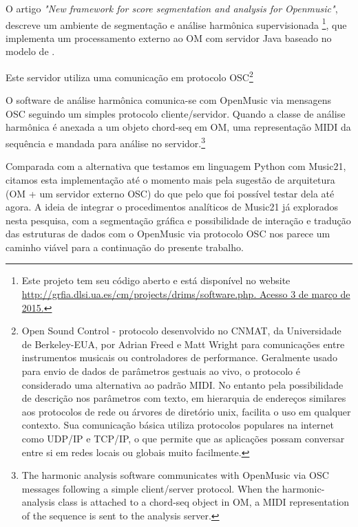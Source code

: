 \documentclass[
	12pt,				%
	openright,			%
	twoside,			%
	a4paper,			%
	english,			%
	french,				%
	spanish,			%
	brazil				%
	]{abntex2}
\begin{document}
O artigo \textit{"New framework for score segmentation and analysis for Openmusic"}\cite{bresson2012new}, descreve um ambiente de segmentação e análise harmônica supervisionada \footnote{Este projeto tem seu código aberto e está disponível no website \url{http://grfia.dlsi.ua.es/cm/projects/drims/software.php. Acesso 3 de março de 2015.}}, que implementa um processamento externo ao OM com servidor Java baseado no modelo de .

Este servidor utiliza uma comunicação em protocolo OSC\footnote{Open Sound Control - protocolo desenvolvido no CNMAT, da Universidade de Berkeley-EUA, por Adrian Freed e Matt Wright para comunicações entre instrumentos musicais ou controladores de performance. Geralmente usado para envio de dados de parâmetros gestuais ao vivo, o protocolo é considerado uma alternativa ao padrão MIDI. No entanto pela possibilidade de descrição nos parâmetros com texto, em hierarquia de endereços similares aos protocolos de rede ou árvores de diretório unix, facilita o uso em qualquer contexto. Sua comunicação básica utiliza protocolos populares na internet como UDP/IP e TCP/IP, o que permite que as aplicações possam conversar entre si em redes locais ou globais muito facilmente. }

\begin{citacao}
O software de análise harmônica comunica-se com OpenMusic via mensagens OSC seguindo um simples protocolo cliente/servidor. Quando a classe de análise harmônica é anexada a um objeto chord-seq em OM, uma representação MIDI da sequência e mandada para análise no servidor.\cite[p. 4]{bresson2012new}\footnote{The harmonic analysis software communicates with OpenMusic via OSC messages following a simple client/server protocol. When the harmonic-analysis class is attached to a chord-seq object in OM, a MIDI representation of the sequence is sent to the analysis server.\cite[p. 4]{bresson2012new}}
\end{citacao}		


Comparada com a alternativa que testamos em linguagem Python com Music21, citamos esta implementação até o momento mais pela sugestão de arquitetura (OM + um servidor externo OSC) do que pelo que foi possível testar dela até agora. A ideia de integrar o procedimentos analíticos de Music21 já explorados nesta pesquisa, com a segmentação gráfica e possibilidade de interação e tradução das estruturas de dados com o OpenMusic via protocolo OSC nos parece um caminho viável para a continuação do presente trabalho.
	
\end{document}
